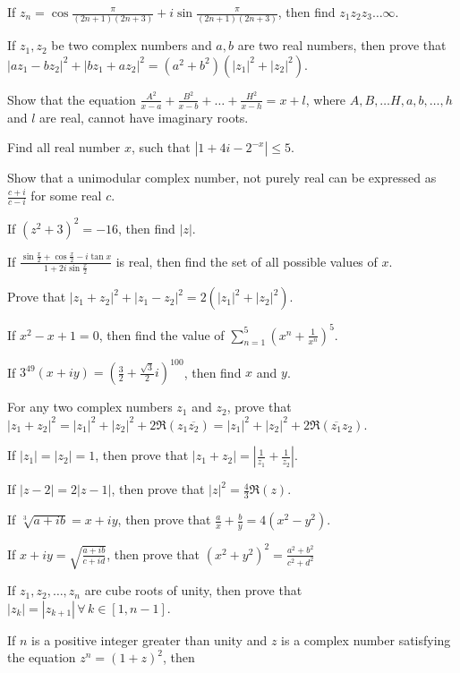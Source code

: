 \item If $z_n = \cos\frac{\pi}{(2n + 1)(2n + 3)} + i\sin\frac{\pi}{(2n + 1)(2n + 3)}$, then find $z_1z_2z_3\ldots\infty$.
\item If $z_1, z_2$ be two complex numbers and $a, b$ are two real numbers, then prove that $|az_1 - bz_2|^2 + |bz_1 + az_2|^2 =
  (a^2 + b^2)(|z_1|^2 + |z_2|^2)$.
\item Show that the equation $\frac{A^2}{x - a} + \frac{B^2}{x - b} + \ldots + \frac{H^2}{x - h} = x + l$, where $A, B, \ldots H,
  a, b, \ldots, h$ and $l$ are real, cannot have imaginary roots.
\item Find all real number $x$, such that $|1 + 4i - 2^{-x}|\leq 5$.
\item Show that a unimodular complex number, not purely real can be expressed as $\frac{c + i}{c - i}$ for some real $c$.
\item If $(z^2 + 3)^2 = -16$, then find $|z|$.
\item If $\frac{\sin\frac{x}{2} + \cos\frac{x}{2} - i\tan x}{1 + 2i\sin\frac{x}{2}}$ is real, then find the set of all possible
  values of $x$.
\item Prove that $|z_1 + z_2|^2 + |z_1 - z_2|^2 = 2(|z_1|^2 + |z_2|^2)$.
\item If $x^2 - x + 1 = 0$, then find the value of $\sum_{n = 1}^5\left(x^n + \frac{1}{x^n}\right)^5$.
\item If $3^{49}(x + iy) = \left(\frac{3}{2} + \frac{\sqrt{3}}{2}i\right)^{100}$, then find $x$ and $y$.
\item For any two complex numbers $z_1$ and $z_2$, prove that $|z_1 + z_2|^2 = |z_1|^2 + |z_2|^2 + 2\Re(z_1\overline{z_2}) = |z_1|^2
  + |z_2|^2 + 2\Re(\overline{z_1}z_2)$.
\item If $|z_1| = |z_2| = 1$, then prove that $|z_1 + z_2| = \left|\frac{1}{z_1} + \frac{1}{z_2}\right|$.
\item If $|z - 2| = 2|z - 1|$, then prove that $|z|^2 = \frac{4}{3}\Re(z)$.
\item If $\sqrt[3]{a + ib} = x + iy$, then prove that $\frac{a}{x} + \frac{b}{y} = 4(x^2 - y^2)$.
\item If $x + iy = \sqrt{\frac{a + ib}{c + id}}$, then prove that $(x^2 + y^2)^2 = \frac{a^2 + b^2}{c^2 + d^2}$
\item If $z_1, z_2, \ldots, z_n$ are cube roots of unity, then prove that $|z_k| = |z_{k + 1}|\,\forall\,k\in[1, n - 1]$.
\item If $n$ is a positive integer greater than unity and $z$ is a complex number satisfying the equation $z^n = (1 + z)^2$, then
